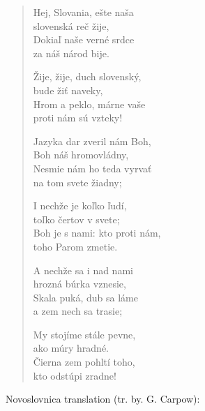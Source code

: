 \begin{verse}
	Hej, Slovania, ešte naša \\
	slovenská reč žije, \\
	Dokiaľ naše verné srdce \\
	za náš národ bije.
	
	Žije, žije, duch slovenský, \\
	bude žiť naveky, \\
	Hrom a peklo, márne vaše \\
	proti nám sú vzteky!
	
	Jazyka dar zveril nám Boh, \\
	Boh náš hromovládny, \\
	Nesmie nám ho teda vyrvať \\
	na tom svete žiadny;
	
	I nechže je koľko ľudí, \\
	toľko čertov v svete; \\
	Boh je s nami: kto proti nám, \\
	toho Parom zmetie.
	
	A nechže sa i nad nami \\
	hrozná búrka vznesie, \\
	Skala puká, dub sa láme \\
	a zem nech sa trasie;
	
	My stojíme stále pevne, \\
	ako múry hradné. \\
	Čierna zem pohltí toho, \\
	kto odstúpi zradne!
\end{verse}

Novoslovnica translation (tr. by. G. Carpow):

